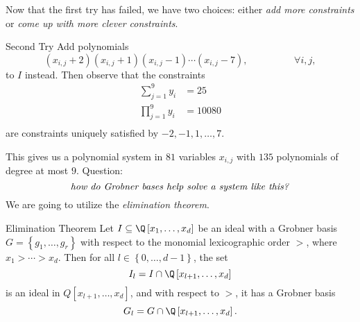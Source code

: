\documentclass[co439]{subfiles}
\begin{document}
    \np Now that the first try has failed, we have two choices: either \textit{add more constraints} or \textit{come up with more clever constraints}.

    \begin{boxy}{\itckabelstd Second Try}
        Add polynomials
        \begin{equation*}
            \left( x_{i,j}+2 \right)\left( x_{i,j}+1 \right)\left( x_{i,j}-1 \right)\cdots\left( x_{i,j}-7 \right), \hspace{2cm}\forall i,j,
        \end{equation*}
        to $I$ instead. Then observe that the constraints
        \begin{equation*}
            \begin{aligned}
                \sum^{9}_{j=1} y_i & = 25 \\
                \prod^{9}_{j=1} y_i & = 10080 \\
            \end{aligned} 
        \end{equation*}
        are constraints uniquely satisfied by $-2,-1,1,\ldots,7$.
    \end{boxy}

    \np This gives us a polynomial system in $81$ variables $x_{i,j}$ with $135$ polynomials of degree at most $9$. Question:
    \begin{equation*}
        \text{\textit{how do Grobner bases help solve a system like this?}}
    \end{equation*}
    We are going to utilize the \textit{elimination theorem}.

    \begin{theorem}{Elimination Theorem}
        Let $I\subseteq\Q\left[ x_1,\ldots,x_d \right]$ be an ideal with a Grobner basis $G=\left\lbrace g_1,\ldots,g_r \right\rbrace$ with respect to the monomial lexicographic order $>$, where $x_1>\cdots>x_d$. Then for all $l\in \left\lbrace 0,\ldots,d-1 \right\rbrace$, the set
        \begin{equation*}
            I_l = I\cap\Q\left[ x_{l+1},\ldots,x_d \right]
        \end{equation*}
        is an ideal in $Q\left[ x_{l+1},\ldots,x_d \right]$, and with respect to $>$, it has a Grobner basis
        \begin{equation*}
            G_l = G\cap\Q\left[ x_{l+1},\ldots,x_d \right].
        \end{equation*}
    \end{theorem}
    
\end{document}
